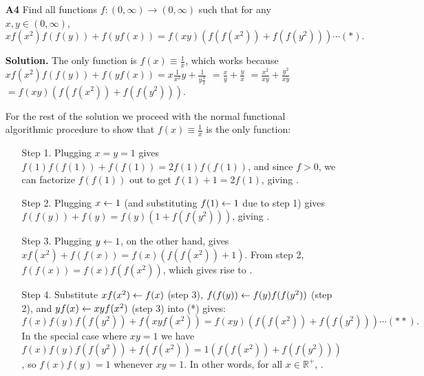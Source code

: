\documentclass[11pt,a4paper]{article}
\begin{document}
\begin{itemize}
\item[\textbf{A4}]
Find all functions $f:(0,\infty)\rightarrow (0,\infty)$ such that for any $x,y\in (0,\infty)$, $$xf(x^2)f(f(y)) + f(yf(x)) = f(xy) \left(f(f(x^2)) + f(f(y^2))\right)\cdots (*).$$

\textbf{Solution.} 
The only function is $f(x)\equiv \frac 1x$, which works because 
$xf(x^2)f(f(y)) + f(yf(x))=x\frac1 {x^2} y+\frac 1 {y\frac 1{x}}$
$=\frac xy+\frac yx$
$=\frac{x^2}{xy}+\frac{y^2}{xy}$
$=f(xy)\left(f(f(x^2)) + f(f(y^2))\right)$. 

For the rest of the solution we proceed with the normal functional algorithmic procedure to show that $f(x)\equiv \frac 1x$ is the only function: 
\begin{itemize}
\item [Step 1.] 
Plugging $x=y=1$ gives $f(1)f(f(1))+f(f(1))=2f(1)f(f(1))$, 
and since $f>0$, we can factorize $f(f(1))$ out to get $f(1)+1=2f(1)$, giving . 

\item [Step 2.]
Plugging $x\leftarrow 1$ (and substituting $f(1)\leftarrow 1$ due to step 1) gives $f(f(y))+f(y)=f(y)(1+f(f(y^2)))$, 
giving . 

\item [Step 3.]
Plugging $y\leftarrow 1$, on the other hand, gives 
$xf(x^2)+f(f(x))=f(x)(f(f(x^2))+1)$. 
From step 2, $f(f(x))=f(x)f(f(x^2))$, 
which gives rise to . 

\item [Step 4.]
Substitute $xf(x^2)\leftarrow f(x)$ (step 3), $f(f(y))\leftarrow f(y)f(f(y^2))$ (step 2), and $yf(x)\leftarrow xyf(x^2)$ (step 3) into (*) gives: 
$$f(x)f(y)f(f(y^2)) + f(xyf(x^2)) = f(xy) \left(f(f(x^2)) + f(f(y^2))\right)\cdots(**).$$
In the special case where $xy=1$ we have $f(x)f(y)f(f(y^2)) + f(f(x^2)) = 1 \left(f(f(x^2)) + f(f(y^2))\right)$, 
so $f(x)f(y)=1$ whenever $xy=1$. 
In other words, for all $x\in\mathbb{R}^+$, . 


\end{itemize}
\end{itemize}
\end{document}
